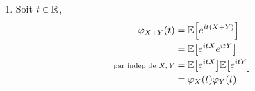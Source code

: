 {\begin{td-sol}[]
\begin{enumerate}
\begin{itemize}
                \item Pour \(X \sim \mathcal P(\lambda)\),
                \begin{equation*}
                    \begin{aligned}
                        \bb P(X=k)
                        &= \frac{e^{-\lambda}\lambda^k}{k!}\\
                        \varphi_X(t)
                        &= \bb E\ff{e^{itX}}\\
                        &= \sum_{k=0}^{\infty} e^{itk} \frac{e^{-\lambda}\lambda^k}{k!}\\
                        &= e^{-\lambda} \sum_{k=0}^{\infty} \frac{{(e^{it}\lambda)}^k}{k!}\\
                        &= e^{-\lambda} e^{e^{it}\lambda}\\
                        &= e^{\lambda(e^{it} - 1)}
                    \end{aligned}
                \end{equation*}

                \item Pour \(X \sim \mathcal N(\mu,\sigma^2)\),
                \begin{equation*}
                    \begin{aligned}
                        Y = \frac{X - \mu}{\sigma} \sim \mathcal N(0,1)\\
                        \varphi_X(t)
                        &= \bb E\ff{e^{itX}}\\
                        &= \bb E\ff{e^{it(\mu + \sigma Y)}}\\
                        &= e^{it\mu} \bb E\ff{e^{it\sigma Y}}\\
                        &= e^{it\mu} \varphi_Y(\sigma t)\\
                        &= e^{it\mu - \frac{1}{2}\sigma^2t^2}
                    \end{aligned}
                \end{equation*}
            \end{itemize}

            \item Soit \(t \in \mathbb{R}\),
            \begin{equation*}
                \begin{aligned}
                    \varphi_{X+Y}(t)
                    &= \mathbb{E}\mathopen{}\left[e^{it(X+Y)}\right]\mathclose{}\\
                    &= \mathbb{E}\mathopen{}\left[e^{itX}e^{itY}\right]\mathclose{}\\
                    \text{\scriptsize{par indep de \(X,Y\)}}&= \mathbb{E}\mathopen{}\left[e^{itX}\right]\mathclose{}\mathbb{E}\mathopen{}\left[e^{itY}\right]\mathclose{}\\
                    &= \varphi_X(t)\varphi_Y(t)
                \end{aligned}
            \end{equation*}


\end{enumerate}
\end{td-sol}}
